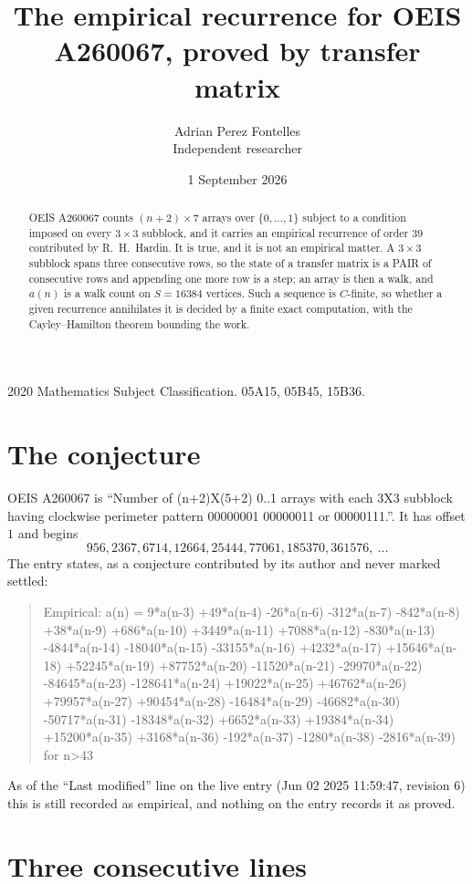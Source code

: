 \documentclass[11pt,a4paper]{article}
\title{The empirical recurrence for OEIS A260067, proved by transfer matrix}
\author{Adrian Perez Fontelles\\ \small Independent researcher}
\date{1 September 2026}
\theoremstyle{plain}
\theoremstyle{definition}
\begin{document}
\maketitle

\begin{abstract}
OEIS A260067 counts $(n+2)\times7$ arrays over $\{0,\dots,1\}$ subject to a condition imposed on
every $3\times3$ subblock, and it carries an empirical recurrence of order $39$
contributed by R.~H.~Hardin. It is true, and it is not an empirical matter. A $3\times3$
subblock spans three consecutive rows, so the state of a transfer matrix is a PAIR of
consecutive rows and appending one more row is a step; an array is then a walk, and
$a(n)$ is a walk count on $S=16384$ vertices. Such a sequence is $C$-finite, so whether a given
recurrence annihilates it is decided by a finite exact computation, with the Cayley--Hamilton
theorem bounding the work.
\end{abstract}

\noindent\small 2020 Mathematics Subject Classification. 05A15, 05B45, 15B36.\normalsize

\section{The conjecture}

OEIS A260067 is ``Number of (n+2)X(5+2) 0..1 arrays with each 3X3 subblock having clockwise perimeter pattern 00000001 00000011 or 00000111.''. It has offset $1$ and begins
\[
956, 2367, 6714, 12664, 25444, 77061, 185370, 361576,\ \dots
\]
The entry states, as a conjecture contributed by its author and never marked settled:
\begin{quote}
Empirical: a(n) = 9*a(n-3) +49*a(n-4) -26*a(n-6) -312*a(n-7) -842*a(n-8) +38*a(n-9) +686*a(n-10) +3449*a(n-11) +7088*a(n-12) -830*a(n-13) -4844*a(n-14) -18040*a(n-15) -33155*a(n-16) +4232*a(n-17) +15646*a(n-18) +52245*a(n-19) +87752*a(n-20) -11520*a(n-21) -29970*a(n-22) -84645*a(n-23) -128641*a(n-24) +19022*a(n-25) +46762*a(n-26) +79957*a(n-27) +90454*a(n-28) -16484*a(n-29) -46682*a(n-30) -50717*a(n-31) -18348*a(n-32) +6652*a(n-33) +19384*a(n-34) +15200*a(n-35) +3168*a(n-36) -192*a(n-37) -1280*a(n-38) -2816*a(n-39) for n>43
\end{quote}
As of the ``Last modified'' line on the live entry (Jun 02 2025 11:59:47, revision 6) this is still
recorded as empirical, and nothing on the entry records it as proved.

\section{Three consecutive lines}
\end{document}
